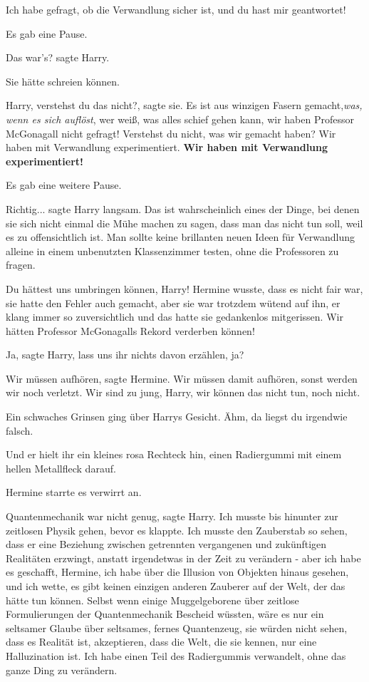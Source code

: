 \glqq{}Ich habe gefragt, ob die Verwandlung sicher ist, und du hast mir
geantwortet!\grqq{}

Es gab eine Pause.

\glqq{}Das war's?\grqq{} sagte Harry.

Sie hätte schreien können.

\glqq{}Harry, verstehst du das nicht?\grqq{}, sagte sie. \glqq{}Es ist aus
winzigen Fasern gemacht,\emph{was, wenn es sich auflöst}, wer weiß, was alles
schief gehen kann, wir haben Professor McGonagall nicht gefragt! Verstehst du
nicht, was wir gemacht haben? Wir haben mit Verwandlung experimentiert.
\textbf{Wir haben mit Verwandlung experimentiert!}\grqq{}

Es gab eine weitere Pause.

\glqq{}Richtig...\grqq{} sagte Harry langsam. \glqq{} Das ist wahrscheinlich
eines der Dinge, bei denen sie sich nicht einmal die Mühe machen zu sagen, dass
man das nicht tun soll, weil es zu offensichtlich ist. Man sollte keine
brillanten neuen Ideen für Verwandlung alleine in einem unbenutzten
Klassenzimmer testen, ohne die Professoren zu fragen.\grqq{}

\glqq{}Du hättest uns umbringen können, Harry!\grqq{} Hermine wusste, dass es
nicht fair war, sie hatte den Fehler auch gemacht, aber sie war trotzdem wütend
auf ihn, er klang immer so zuversichtlich und das hatte sie gedankenlos
mitgerissen. \glqq{}Wir hätten Professor McGonagalls Rekord verderben
können!\grqq{}

\glqq{}Ja\grqq{}, sagte Harry, \glqq{}lass uns ihr nichts davon erzählen,
ja?\grqq{}

\glqq{}Wir müssen aufhören\grqq{}, sagte Hermine. \glqq{}Wir müssen damit
aufhören, sonst werden wir noch verletzt. Wir sind zu jung, Harry, wir können
das nicht tun, noch nicht.\grqq{}

Ein schwaches Grinsen ging über Harrys Gesicht. \glqq{}Ähm, da liegst du
irgendwie falsch.\grqq{}

Und er hielt ihr ein kleines rosa Rechteck hin, einen Radiergummi mit einem
hellen Metallfleck darauf.

Hermine starrte es verwirrt an.

\glqq{}Quantenmechanik war nicht genug\grqq{}, sagte Harry. \glqq{}Ich musste
bis hinunter zur zeitlosen Physik gehen, bevor es klappte. Ich musste den
Zauberstab so sehen, dass er eine Beziehung zwischen getrennten vergangenen und
zukünftigen Realitäten erzwingt, anstatt irgendetwas in der Zeit zu verändern -
aber ich habe es geschafft, Hermine, ich habe über die Illusion von Objekten
hinaus gesehen, und ich wette, es gibt keinen einzigen anderen Zauberer auf der
Welt, der das hätte tun können. Selbst wenn einige Muggelgeborene über zeitlose
Formulierungen der Quantenmechanik Bescheid wüssten, wäre es nur ein seltsamer
Glaube über seltsames, fernes Quantenzeug, sie würden nicht sehen, dass es
Realität ist, akzeptieren, dass die Welt, die sie kennen, nur eine Halluzination
ist. Ich habe einen Teil des Radiergummis verwandelt, ohne das ganze Ding zu
verändern.\grqq{}

